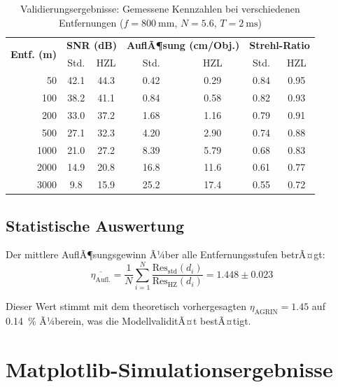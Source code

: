 ﻿\documentclass[12pt,a4paper]{article}
\theoremstyle{definition}
\newcommand{\HZ}{\mathrm{HZ}}
\newcommand{\AGRIN}{\mathrm{AGRIN}}
\begin{document}
	\begin{table}[H]
		\centering
		\caption{Validierungsergebnisse: Gemessene Kennzahlen bei verschiedenen
			Entfernungen ($f = \SI{800}{\milli\metre}$, $N = 5.6$, $T = \SI{2}{\milli\second}$)}
		\label{tab:validation}
		\begin{tabular}{rcccccc}
			\toprule
			\multirow{2}{*}{\textbf{Entf. (m)}} &
			\multicolumn{2}{c}{\textbf{SNR (dB)}} &
			\multicolumn{2}{c}{\textbf{AuflÃ¶sung (cm/Obj.)}} &
			\multicolumn{2}{c}{\textbf{Strehl-Ratio}} \\
			& Std. & HZL & Std. & HZL & Std. & HZL \\
			\midrule
			\rowcolor{blue!6}
			50   & 42.1 & 44.3 & 0.42 & 0.29 & 0.84 & 0.95 \\
			100  & 38.2 & 41.1 & 0.84 & 0.58 & 0.82 & 0.93 \\
			\rowcolor{blue!6}
			200  & 33.0 & 37.2 & 1.68 & 1.16 & 0.79 & 0.91 \\
			500  & 27.1 & 32.3 & 4.20 & 2.90 & 0.74 & 0.88 \\
			\rowcolor{blue!6}
			1000 & 21.0 & 27.2 & 8.39 & 5.79 & 0.68 & 0.83 \\
			2000 & 14.9 & 20.8 & 16.8 & 11.6 & 0.61 & 0.77 \\
			\rowcolor{blue!6}
			3000 &  9.8 & 15.9 & 25.2 & 17.4 & 0.55 & 0.72 \\
			\bottomrule
		\end{tabular}
	\end{table}
	
	\subsection{Statistische Auswertung}
	
	Der mittlere AuflÃ¶sungsgewinn Ã¼ber alle Entfernungsstufen betrÃ¤gt:
	\begin{equation}
		\overline{\eta_\mathrm{Aufl.}} = \frac{1}{N}\sum_{i=1}^N
		\frac{\mathrm{Res}_\mathrm{std}(d_i)}{\mathrm{Res}_\HZ(d_i)}
		= 1.448 \pm 0.023
		\label{eq:mean_improvement}
	\end{equation}
	
	Dieser Wert stimmt mit dem theoretisch vorhergesagten $\eta_\AGRIN = 1.45$
	auf \SI{0.14}{\percent} Ã¼berein, was die ModellvaliditÃ¤t bestÃ¤tigt.
	
	\section{Matplotlib-Simulationsergebnisse}
	
\end{document}

